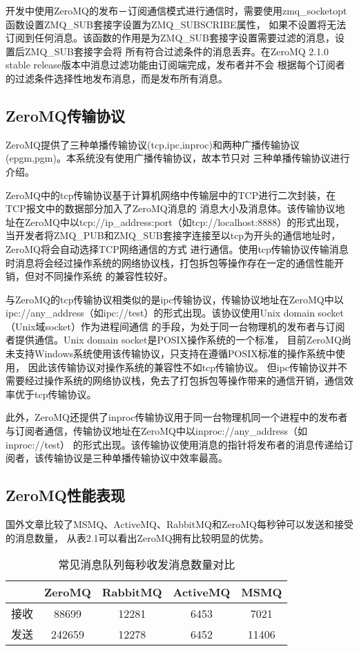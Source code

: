 开发中使用ZeroMQ的发布－订阅通信模式进行通信时，需要使用zmq\_socketopt函数设置ZMQ\_SUB套接字设置为ZMQ\_SUBSCRIBE属性，
如果不设置将无法订阅到任何消息。该函数的作用是为ZMQ\_SUB套接字设置需要过滤的消息，设置后ZMQ\_SUB套接字会将
所有符合过滤条件的消息丢弃。在ZeroMQ 2.1.0 stable release版本中消息过滤功能由订阅端完成，发布者并不会
根据每个订阅者的过滤条件选择性地发布消息，而是发布所有消息。

\subsection{ZeroMQ传输协议}
ZeroMQ提供了三种单播传输协议(tcp,ipc,inproc)和两种广播传输协议(epgm,pgm)。本系统没有使用广播传输协议，故本节只对
三种单播传输协议进行介绍。

ZeroMQ中的tcp传输协议基于计算机网络中传输层中的TCP进行二次封装，在TCP报文中的数据部分加入了ZeroMQ消息的
消息大小及消息体。该传输协议地址在ZeroMQ中以tcp://ip\_address:port（如tcp://localhost:8888）的形式出现，
当开发者将ZMQ\_PUB和ZMQ\_SUB套接字连接至以tcp为开头的通信地址时，ZeroMQ将会自动选择TCP网络通信的方式
进行通信。使用tcp传输协议传输消息时消息将会经过操作系统的网络协议栈，打包拆包等操作存在一定的通信性能开销，但对不同操作系统
的兼容性较好。

与ZeroMQ的tcp传输协议相类似的是ipc传输协议，传输协议地址在ZeroMQ中以ipc://any\_address（如ipc://test）的形式出现。该协议使用Unix domain socket（Unix域socket）作为进程间通信
的手段，为处于同一台物理机的发布者与订阅者提供通信。Unix domain socket是POSIX操作系统的一个标准，
目前ZeroMQ尚未支持Windows系统使用该传输协议，只支持在遵循POSIX标准的操作系统中使用，
因此该传输协议对操作系统的兼容性不如tcp传输协议。
但ipc传输协议并不需要经过操作系统的网络协议栈，免去了打包拆包等操作带来的通信开销，通信效率优于tcp传输协议。

此外，ZeroMQ还提供了inproc传输协议用于同一台物理机同一个进程中的发布者与订阅者通信，传输协议地址在ZeroMQ中以inproc://any\_address（如inproc://test）
的形式出现。该传输协议使用消息的指针将发布者的消息传递给订阅者，该传输协议是三种单播传输协议中效率最高。

\subsection{ZeroMQ性能表现}
国外文章\cite{mqcompare}比较了MSMQ、ActiveMQ、RabbitMQ和ZeroMQ每秒钟可以发送和接受的消息数量，
从表2.1可以看出ZeroMQ拥有比较明显的优势。
\begin{table}[htb]
  \centering\small
  \caption{常见消息队列每秒收发消息数量对比\cite{mqcompare}}
  \label{tab:exampletable}
  \begin{tabular}{ccccc}
    \toprule
    & ZeroMQ & RabbitMQ & ActiveMQ & MSMQ \\
    \midrule
    接收 & 88699 & 12281 & 6453 & 7021 \\
    发送 & 242659 & 12278 & 6452 & 11406 \\
    \bottomrule
  \end{tabular}
\end{table}


